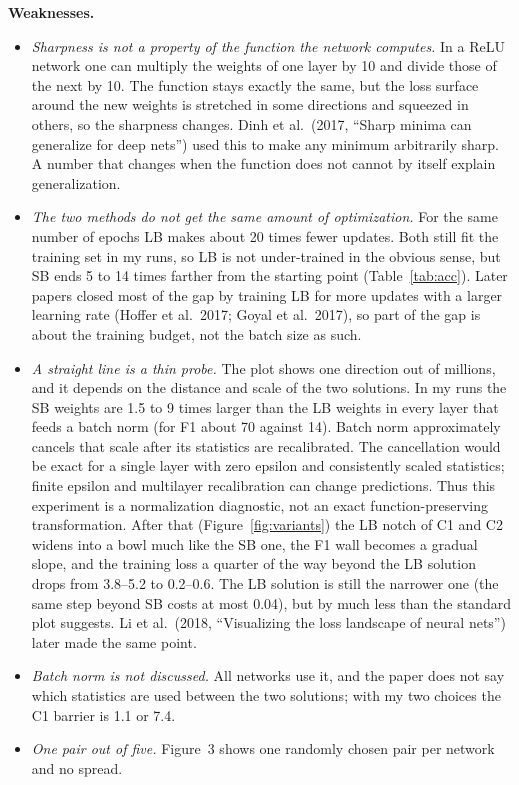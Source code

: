 \textbf{Weaknesses.}
\begin{itemize}
\item \emph{Sharpness is not a property of the function the network computes.} In a ReLU network one can multiply the weights of one layer by 10 and divide those of the next by 10. The function stays exactly the same, but the loss surface around the new weights is stretched in some directions and squeezed in others, so the sharpness changes. Dinh et al.\ (2017, ``Sharp minima can generalize for deep nets'') used this to make any minimum arbitrarily sharp. A number that changes when the function does not cannot by itself explain generalization.
\item \emph{The two methods do not get the same amount of optimization.} For the same number of epochs LB makes about 20 times fewer updates. Both still fit the training set in my runs, so LB is not under-trained in the obvious sense, but SB ends 5 to 14 times farther from the starting point (Table~\ref{tab:acc}). Later papers closed most of the gap by training LB for more updates with a larger learning rate (Hoffer et al.\ 2017; Goyal et al.\ 2017), so part of the gap is about the training budget, not the batch size as such.
\item \emph{A straight line is a thin probe.} The plot shows one direction out of millions, and it depends on the distance and scale of the two solutions. In my runs the SB weights are 1.5 to 9 times larger than the LB weights in every layer that feeds a batch norm (for F1 about 70 against 14). Batch norm approximately cancels that scale after its statistics are recalibrated. The cancellation would be exact for a single layer with zero epsilon and consistently scaled statistics; finite epsilon and multilayer recalibration can change predictions. Thus this experiment is a normalization diagnostic, not an exact function-preserving transformation. After that (Figure~\ref{fig:variants}) the LB notch of C1 and C2 widens into a bowl much like the SB one, the F1 wall becomes a gradual slope, and the training loss a quarter of the way beyond the LB solution drops from 3.8--5.2 to 0.2--0.6. The LB solution is still the narrower one (the same step beyond SB costs at most 0.04), but by much less than the standard plot suggests. Li et al.\ (2018, ``Visualizing the loss landscape of neural nets'') later made the same point.
\item \emph{Batch norm is not discussed.} All networks use it, and the paper does not say which statistics are used between the two solutions; with my two choices the C1 barrier is 1.1 or 7.4.
\item \emph{One pair out of five.} Figure~3 shows one randomly chosen pair per network and no spread.
\end{itemize}

